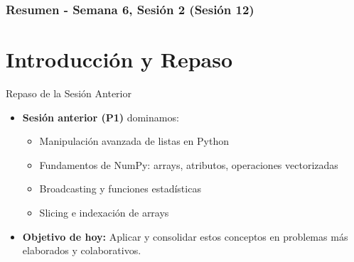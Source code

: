 \documentclass[10pt]{beamer}
\begin{document}
\myfront{}

\begin{frame}
  \titlepage
\end{frame}

\begin{frame}
  \frametitle{Resumen - Semana 6, Sesión 2 (Sesión 12)}
  \tableofcontents
\end{frame}


\section{Introducción y Repaso}

\begin{frame}{Repaso de la Sesión Anterior}
  \begin{itemize}
    \item \textbf{Sesión anterior (P1)} dominamos:
      \begin{itemize}
        \item Manipulación avanzada de listas en Python
        \item Fundamentos de NumPy: arrays, atributos, operaciones vectorizadas
        \item Broadcasting y funciones estadísticas
        \item Slicing e indexación de arrays
      \end{itemize}
    \item \textbf{Objetivo de hoy:} Aplicar y consolidar estos conceptos en problemas más elaborados y colaborativos.
  \end{itemize}
\end{frame}
\end{document}
